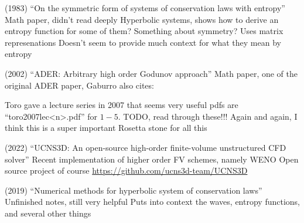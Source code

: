 \begin{outline}
  \1 (1983) ``On the symmetric form of systems of conservation laws with entropy'' \cite{harten1983symmetric}
  \2 Math paper, didn't read deeply
  \2 Hyperbolic systems, shows how to derive an entropy function for some of them? Something about symmetry? Uses matrix represenations
  \2 Doesn't seem to provide much context for what they mean by entropy

  \1 (2002) ``ADER: Arbitrary high order Godunov approach'' \cite{titarev2002ader}
  \2 Math paper, one of the original ADER paper, Gaburro also cites:

  \1 Toro gave a lecture series in 2007 that seems very useful \cite{toro2007lec} 
  \2 pdfs are ``toro2007lec<n>.pdf'' for $1-5$.
  \2 TODO, read through these!!! Again and again, I think this is a super important Rosetta stone for all this

\1 (2022) ``UCNS3D: An open-source high-order finite-volume unstructured CFD solver'' \cite{antoniadis2022ucns3d}
\2 Recent implementation of higher order FV schemes, namely WENO 
\2 Open source project of course \url{https://github.com/ucns3d-team/UCNS3D}

\1 (2019) ``Numerical methods for hyperbolic system of conservation laws'' \cite{chandrashekar2019num}
\2 Unfinished notes, still very helpful
\2 Puts into context the waves, entropy functions, and several other things
\end{outline}


